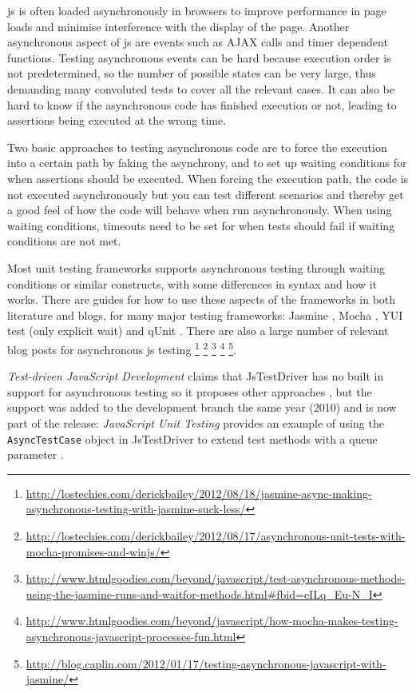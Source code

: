 \documentclass[11pt]{article}
\begin{document}
\gls{js} is often loaded asynchronously in browsers to improve performance in page loads and minimise interference with the display of the page. Another asynchronous aspect of \gls{js} are events such as AJAX calls and timer dependent functions. Testing asynchronous events can be hard because execution order is not predetermined, so the number of possible states can be very large, thus demanding many convoluted tests to cover all the relevant cases. It can also be hard to know if the asynchronous code has finished execution or not, leading to assertions being executed at the wrong time.

Two basic approaches to testing asynchronous code are to force the execution into a certain path by faking the asynchrony, and to set up waiting conditions for when assertions should be executed. When forcing the execution path, the code is not executed asynchronously but you can test different scenarios and thereby get a good feel of how the code will behave when run asynchronously. When using waiting conditions, timeouts need to be set for when tests should fail if waiting conditions are not met.

Most unit testing frameworks supports asynchronous testing through waiting conditions or similar constructs, with some differences in syntax and how it works. There are guides for how to use these aspects of the frameworks in both literature and blogs, for many major testing frameworks: Jasmine \cite[p.~35]{JasmineBook}\cite[p.~45-49]{JSUT}, Mocha \cite[p.~59-65]{UsingNode}, YUI test (only explicit wait) \cite[p.~78-79]{JSUT} and qUnit \cite[p.~114-116]{JSUT}. There are also a large number of relevant blog posts for asynchronous \gls{js} testing
\footnote{\url{http://lostechies.com/derickbailey/2012/08/18/jasmine-async-making-asynchronous-testing-with-jasmine-suck-less/}}
\footnote{\url{http://lostechies.com/derickbailey/2012/08/17/asynchronous-unit-tests-with-mocha-promises-and-winjs/}}
\footnote{\url{http://www.htmlgoodies.com/beyond/javascript/test-asynchronous-methods-using-the-jasmine-runs-and-waitfor-methods.html\#fbid=eILq_Eu-N_I}}
\footnote{\url{http://www.htmlgoodies.com/beyond/javascript/how-mocha-makes-testing-asynchronous-javascript-processes-fun.html}}
\footnote{\url{http://blog.caplin.com/2012/01/17/testing-asynchronous-javascript-with-jasmine/}}. %

\emph{Test-driven JavaScript Development} claims that JsTestDriver has no built in support for asynchronous testing so it proposes other approaches \cite[p.~247-387]{Tddjs}, but the support was added to the development branch the same year (2010) and is now part of the release: \emph{JavaScript Unit Testing} provides an example of using the \texttt{AsyncTestCase} object in JsTestDriver to extend test methods with a queue parameter \cite[p.~143-145]{JSUT}.
\end{document}
